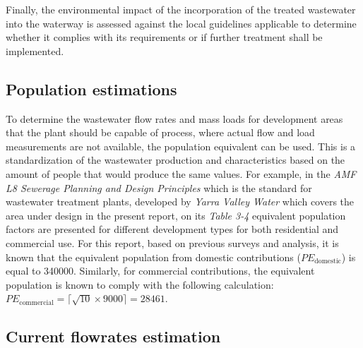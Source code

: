 \documentclass[11pt]{article}
\begin{document}
Finally, the environmental impact of the incorporation of the 
treated wastewater into the waterway is assessed against the 
local guidelines applicable to determine whether it complies 
with its requirements or if further treatment shall be implemented.


\subsection{Population estimations}

To determine the wastewater flow rates and mass loads for development areas that the plant should be capable of process, 
where actual flow and load
measurements are not available, the population equivalent can be used. This is a standardization of the wastewater production
and characteristics based on the amount of people that would produce the same values. For example, in the
\textit{AMF L8 Sewerage Planning and Design Principles}
 which is the standard for wastewater treatment plants, developed by 
 \textit{Yarra Valley Water}
  which covers the area under design in the present report, on its 
\textit{Table 3-4}
 equivalent population factors are presented for different development types for both residential and commercial use. 
For this report, based on previous surveys and analysis, it is known that the equivalent population from 
domestic contributions (\(PE_{\mathrm{domestic}}\)) is equal to 340000.
Similarly, for commercial contributions, the equivalent population is known to comply with the 
following calculation: 
\(PE_{\mathrm{commercial}}
= \bigl\lceil \sqrt{\text{10}}\times 9000 \bigr\rceil
=  \text{28461} \).

\subsection{Current flowrates estimation}
\label{sec:current_flowrates}
\end{document}
